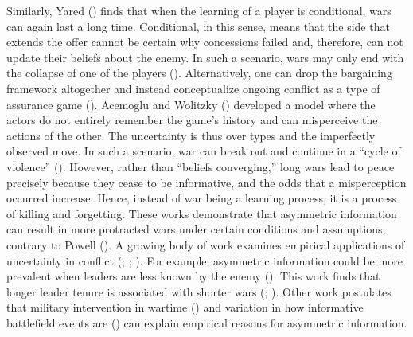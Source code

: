 \documentclass[
  12pt,
]{article}
\theoremstyle{plain}
\theoremstyle{plain}
\theoremstyle{remark}
\begin{document}
Similarly, Yared () finds
that when the learning of a player is conditional, wars can again last a
long time. Conditional, in this sense, means that the side that extends
the offer cannot be certain why concessions failed and, therefore, can
not update their beliefs about the enemy. In such a scenario, wars may
only end with the collapse of one of the players
(). Alternatively,
one can drop the bargaining framework altogether and instead
conceptualize ongoing conflict as a type of assurance game
(). Acemoglu and Wolitzky
() developed a
model where the actors do not entirely remember the game's history and
can misperceive the actions of the other. The uncertainty is thus over
types and the imperfectly observed move. In such a scenario, war can
break out and continue in a ``cycle of violence''
(). However, rather than ``beliefs converging,'' long wars
lead to peace precisely because they cease to be informative, and the
odds that a misperception occurred increase. Hence, instead of war being
a learning process, it is a process of killing and forgetting. These
works demonstrate that asymmetric information can result in more
protracted wars under certain conditions and assumptions, contrary to
Powell (). A
growing body of work examines empirical applications of uncertainty in
conflict (;
;
). For
example, asymmetric information could be more prevalent when leaders are
less known by the enemy
(). This work finds that longer leader tenure is associated
with shorter wars (; ). Other work postulates that military intervention in
wartime ()
and variation in how informative battlefield events are
()
can explain empirical reasons for asymmetric information.
\end{document}
